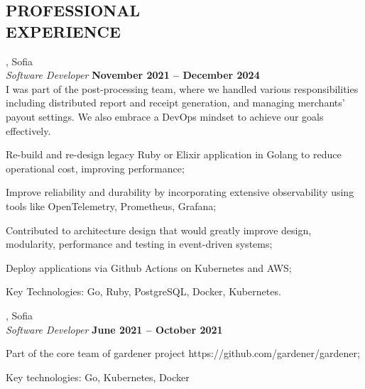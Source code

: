 \documentclass[margin,line]{resume}
\begin{document}
\begin{resume}
\sectionline%

    \section{\mysidestyle\textbf{\large{P}\small{ROFESSIONAL\\EXPERIENCE}}}

    \textbf{}, Sofia \vspace{2mm}\\\vspace{1mm}%
    \textsl{Software Developer} \hfill \textbf{November 2021 {--} December 2024}\\
	I was part of the post-processing team, where we handled various
	responsibilities including distributed report and receipt generation, and managing
	merchants' payout settings. We also embrace a DevOps mindset to achieve our
	goals effectively.\\
    \begin{list2}
        \item Re-build and re-design legacy Ruby or Elixir application in Golang to reduce operational cost, improving performance;\@
		\item Improve reliability and durability by incorporating extensive observability using tools like OpenTelemetry, Prometheus, Grafana;
        \item Contributed to architecture design that would greatly improve design, modularity, performance and testing in event-driven systems;
		\item Deploy applications via Github Actions on Kubernetes and AWS;
		\item Key Technologies: Go, Ruby, PostgreSQL, Docker, Kubernetes.
    \end{list2}

    \textbf{}, Sofia \vspace{2mm}\\\vspace{1mm}%
    \textsl{Software Developer} \hfill \textbf{June 2021 {--} October 2021}\
    \begin{list2}
		\item Part of the core team of gardener project https://github.com/gardener/gardener;\@
        \item Key technologies: Go, Kubernetes, Docker
    \end{list2}


\end{resume}
\end{document}
